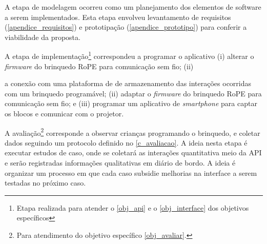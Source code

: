 A etapa de modelagem ocorreu como um planejamento dos elementos de software a serem implementados. Esta etapa envolveu levantamento de requisitos (\autoref{apendice_requisitos}) e prototipação (\autoref{apendice_prototipo}) para conferir a viabilidade da proposta. 

A etapa de implementação\footnote{Etapa realizada para atender o \autoref{obj_api} e o \autoref{obj_interface} dos objetivos específicos} correspondeu a programar o aplicativo 
 (i) alterar o \textit{firmware} do brinquedo RoPE para comunicação sem fio; (ii) 

a conexão com uma plataforma de de armazenamento das interações ocorridas com um brinquedo programável; 
(ii) adaptar o \textit{firmware} do brinquedo RoPE para comunicação sem fio; e (iii) programar um aplicativo de \textit{smartphone} para captar os blocos e comunicar com o projetor.

A avaliação\footnote{ Para atendimento do objetivo específico \autoref{obj_avaliar}.} corresponde a observar crianças programando o brinquedo, e coletar dados seguindo um protocolo definido no \autoref{c_avaliacao}. A ideia nesta etapa é executar estudos de caso, onde se coletará as interações quantitativa meio da \ac{API} e serão registradas informações qualitativas em diário de bordo. A ideia é organizar um processo em que cada caso subsidie melhorias na interface a serem testadas no próximo caso.

